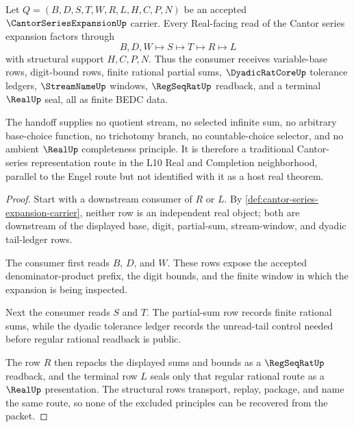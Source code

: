 \begin{theorem}
\label{thm:cantor-series-expansion-real-handoff}
Let $Q=(B,D,S,T,W,R,L,H,C,P,N)$ be an accepted $\CantorSeriesExpansionUp$ carrier. Every Real-facing read of the Cantor series expansion factors through
$$
B,D,W \longmapsto S \longmapsto T \longmapsto R \longmapsto L
$$
with structural support $H,C,P,N$. Thus the consumer receives variable-base rows, digit-bound rows, finite rational partial sums, $\DyadicRatCoreUp$ tolerance ledgers, $\StreamNameUp$ windows, $\RegSeqRatUp$ readback, and a terminal $\RealUp$ seal, all as finite BEDC data.

The handoff supplies no quotient stream, no selected infinite sum, no arbitrary base-choice function, no trichotomy branch, no countable-choice selector, and no ambient $\RealUp$ completeness principle. It is therefore a traditional Cantor-series representation route in the L10 Real and Completion neighborhood, parallel to the Engel route but not identified with it as a host real theorem.
\end{theorem}
\begin{proof}
Start with a downstream consumer of $R$ or $L$. By \autoref{def:cantor-series-expansion-carrier}, neither row is an independent real object; both are downstream of the displayed base, digit, partial-sum, stream-window, and dyadic tail-ledger rows.

The consumer first reads $B$, $D$, and $W$. These rows expose the accepted denominator-product prefix, the digit bounds, and the finite window in which the expansion is being inspected.

Next the consumer reads $S$ and $T$. The partial-sum row records finite rational sums, while the dyadic tolerance ledger records the unread-tail control needed before regular rational readback is public.

The row $R$ then repacks the displayed sums and bounds as a $\RegSeqRatUp$ readback, and the terminal row $L$ seals only that regular rational route as a $\RealUp$ presentation. The structural rows transport, replay, package, and name the same route, so none of the excluded principles can be recovered from the packet.
\end{proof}


